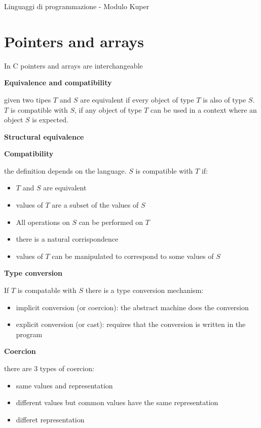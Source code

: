 \documentclass[12pt, a4paper]{article}
\begin{document}
Linguaggi di programmazione - Modulo Kuper

\newpage
\pagestyle{fancy}

\section{Pointers and arrays}
In C pointers and arrays are interchangeable

\textbf{Equivalence and compatibility}

given two tipes $T$ and $S$ are equivalent if every object
of type $T$ is also of type $S$.\\ $T$ is compatible with $S$, if any object of type $T$ can be
used in a context where an object $S$ is expected.

\textbf{Structural equivalence}

\textbf{Compatibility}

the definition depends on the language. $S$ is compatible with $T$ if:
\begin{itemize}
    \item $T$ and $S$ are equivalent
    \item values of $T$ are a subset of the values of $S$
    \item All operations on $S$ can be performed on $T$
    \item there is a natural corrispondence
    \item values of $T$ can be manipulated to correspond to some values of $S$
\end{itemize}

\textbf{Type conversion}

If $T$ is compatable with $S$ there is a type conversion mechanism:
\begin{itemize}
    \item implicit conversion (or coercion): the abstract machine does the conversion
    \item explicit conversion (or cast): requires that the conversion is written in the program
\end{itemize}

\textbf{Coercion}

there are 3 types of coercion:
\begin{itemize}
    \item same values and representation
    \item different values but common values have the same representation
    \item differet representation
\end{itemize}
\end{document}
